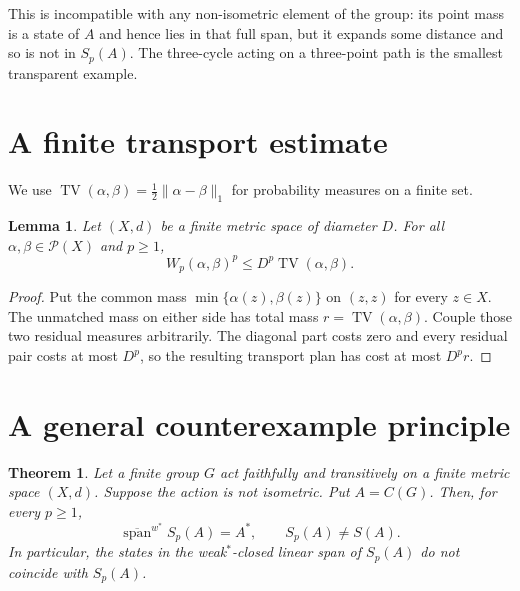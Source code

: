 \documentclass[11pt]{article}
\newtheorem{theorem}{Theorem}
\newtheorem{lemma}{Lemma}
\newcommand{\Prob}{\mathcal P}
\newcommand{\TV}{\operatorname{TV}}
\begin{document}
This is incompatible with any non-isometric element of the group: its point
mass is a state of $A$ and hence lies in that full span, but it expands some
distance and so is not in $S_p(A)$.  The three-cycle acting on a three-point
path is the smallest transparent example.

\section{A finite transport estimate}

We use $\TV(\alpha,\beta)=\frac12\|\alpha-\beta\|_1$ for probability
measures on a finite set.

\begin{lemma}\label{lem:transport}
Let $(X,d)$ be a finite metric space of diameter $D$.  For all
$\alpha,\beta\in\Prob(X)$ and $p\geq1$,
\[
 W_p(\alpha,\beta)^p\leq D^p\TV(\alpha,\beta).
\]
\end{lemma}

\begin{proof}
Put the common mass $\min\{\alpha(z),\beta(z)\}$ on $(z,z)$ for every
$z\in X$.  The unmatched mass on either side has total mass
$r=\TV(\alpha,\beta)$.  Couple those two residual measures arbitrarily.
The diagonal part costs zero and every residual pair costs at most $D^p$,
so the resulting transport plan has cost at most $D^p r$.
\end{proof}

\section{A general counterexample principle}

\begin{theorem}\label{thm:general}
Let a finite group $G$ act faithfully and transitively on a finite metric
space $(X,d)$.  Suppose the action is not isometric.  Put $A=C(G)$.  Then,
for every $p\geq1$,
\[
 \overline{\operatorname{span}}^{w^*}S_p(A)=A^*,
 \qquad S_p(A)\ne S(A).
\]
In particular, the states in the weak$^*$-closed linear span of $S_p(A)$ do
not coincide with $S_p(A)$.
\end{theorem}
\end{document}
